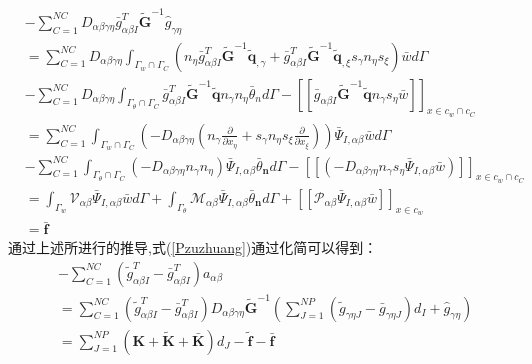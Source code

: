 \begin{equation}
 \begin{split}
    &-\sum_{C=1}^{N\!C}D_{\alpha\beta\gamma\eta}\bar{g}_{\alpha\beta I}^T\tilde{\pmb G}^{-1}\hat{g}_{\gamma\eta }\\
    &=\sum_{C=1}^{N\!C}D_{\alpha\beta\gamma\eta}\int_{{\Gamma_w}\cap{\Gamma_C}}(n_{\eta}
    \bar{g}_{\alpha\beta I}^T\tilde{\pmb G}^{-1}\tilde{\pmb q}_{,\gamma}+\bar{g}_{\alpha\beta I}^T
    \tilde{\pmb G}^{-1}\tilde{\pmb q}_{,\xi}s_{\gamma}n_{\eta}s_{\xi})\bar{w}d\Gamma\\
    &-\sum_{C=1}^{N\!C}D_{\alpha\beta\gamma\eta}\int_{{\Gamma_{\theta}}\cap{\Gamma_{C}}}\bar{g}^T_{\alpha\beta I}\tilde{\pmb G}^{-1}\tilde{\pmb q}n_{\gamma}n_{\eta}\bar{\theta}_nd\Gamma-[[\bar{g}_{\alpha\beta I}\tilde{\pmb G}^{-1}\tilde{\pmb q}n_{\gamma}s_{\eta}\bar{w}]]_{x\in{c_w}\cap{c_C}}\\
    &=\sum_{C=1}^{N\!C}\int_{{\Gamma_w}\cap{\Gamma_C}}(-D_{\alpha\beta\gamma\eta}(n_{\gamma}\frac{\partial}{\partial x_{\eta}}+s_{\gamma}n_{\eta}s_{\xi}\frac{\partial}{\partial x_{\xi}}))\bar{\Psi}_{I,\alpha\beta}\bar{w}d\Gamma\\
    &-\sum_{C=1}^{N\!C}\int_{{\Gamma_{\theta}}\cap{\Gamma_C}}(-D_{\alpha\beta\gamma\eta}n_{\gamma}n_{\eta})\bar{\Psi}_{I,\alpha\beta}\bar{\theta}_{\pmb n}d\Gamma-[[(-D_{\alpha\beta\gamma\eta}n_{\gamma}s_{\eta}\bar{\Psi}_{I,\alpha\beta}\bar{w})]]_{x\in{c_w}\cap{c_C}}\\
    &=\int_{\Gamma_w}\mathcal{V}_{\alpha\beta}\bar{\Psi}_{I,\alpha\beta}\bar{w}d\Gamma+\int_{\Gamma_{\theta}}\mathcal{M}_{\alpha\beta}\bar{\Psi}_{I,\alpha\beta}\bar{\theta}_{\pmb n}d\Gamma+[[\mathcal{P}_{\alpha\beta}\bar{\Psi}_{I,\alpha\beta}\bar{w}]]_{x\in{c_w}}\\
    &=\bar{\pmb f}
\end{split}
\end{equation}
通过上述所进行的推导,式(\ref{Pzuzhuang})通过化简可以得到：
\begin{equation}
\begin{split}
    &-\sum_{C=1}^{N\!C}(\tilde{g}_{\alpha\beta I}^T-\bar{g}_{\alpha\beta I}^T)a_{\alpha\beta}\\
    &=\sum_{C=1}^{N\!C}(\tilde{g}_{\alpha\beta I}^T-\bar{g}_{\alpha\beta I}^T)D_{\alpha\beta\gamma\eta}\tilde{\pmb{G}}^{-1}(\sum_{J=1}^{N\!P}(\tilde{g}_{\gamma\eta J}-\bar{g}_{\gamma\eta J})d_I+\hat{g}_{\gamma\eta})\\
    &=\sum_{J=1}^{N\!P}(\pmb{K}+\tilde{\pmb K}+\bar{\pmb K})d_J-\tilde{\pmb f}-\bar{\pmb f}
\end{split}
\end{equation}
